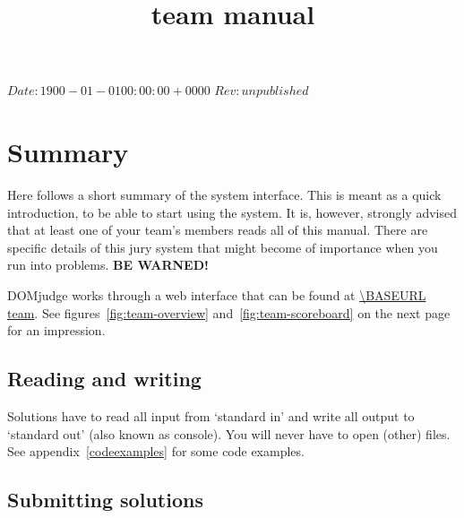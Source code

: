 

\usepackage[english]{babel}

\SVN $Date: 1900-01-01 00:00:00 +0000 $
\SVN $Rev: unpublished $

\title{\DOMjudge team manual}




\titlestuff{\DOMJUDGEVERSION}{\SVNRev}{\SVNDate}{\today}

\section*{Summary}

Here follows a short summary of the system interface. This is meant as
a quick introduction, to be able to start using the system. It is,
however, strongly advised that at least one of your team's members
reads all of this manual. There are specific details of this
jury system that might become of importance when you run into
problems. \textbf{BE WARNED!}

DOMjudge works through a web interface that can be found at
\url{\BASEURL team}. See figures~\ref{fig:team-overview}
and~\ref{fig:team-scoreboard} on the next page for an impression.

\subsection*{Reading and writing}

Solutions have to read all input from `standard in' and write all
output to `standard out' (also known as console). You will never have
to open (other) files. See appendix~\ref{codeexamples} for some code
examples.

\subsection*{Submitting solutions}

